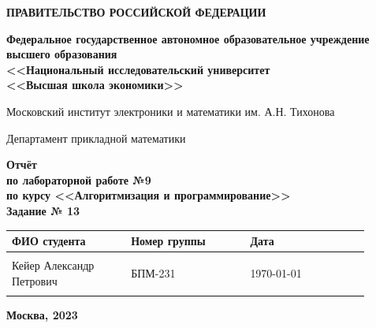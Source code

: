 \documentclass[12pt]{article}
\begin{document}
	
	\thispagestyle{empty}
	\begin{center}
		\textbf{ПРАВИТЕЛЬСТВО РОССИЙСКОЙ ФЕДЕРАЦИИ}
		
		\vspace{5ex}
		
		\textbf{Федеральное государственное автономное образовательное учреждение \\ высшего образования \\ <<Национальный исследовательский университет \\ <<Высшая школа экономики>>}
	\end{center}
	\vspace{5ex}
	
	\begin{center}
		Московский институт электроники и математики им. А.Н. Тихонова  
		
		\vspace{5ex}
		
		Департамент прикладной математики
		
		\vspace{10ex}
		\textbf{Отчёт \\ по лабораторной работе №9 \\ по курсу <<Алгоритмизация и программирование>> \\ Задание № 13}
		\vspace{7ex}
		
	\end{center}
	
	\begin{center} 
		\begin{tabular}{| p{0.3\linewidth}| p{0.3\linewidth}| p{0.3\linewidth}|}
			\hline	
			ФИО студента & Номер группы & Дата \\  \hline
			& & \\  
			Кейер Александр \newline Петрович & БПМ-231 & \today\\  
			& & \\  \hline		
		\end{tabular}
	\end{center}
	
	\begin{center}
		\vspace{3ex}
		
		\vfill
		
		\normalsize
		
		\textbf{Москва, 2023}
	\end{center}
	
\end{document}
